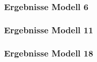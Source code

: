 \documentclass[onlymath]{beamer}
\begin{document}
\begin{frame}
	\frametitle{Ergebnisse Modell 6}
	\centering
\end{frame}


\begin{frame}
	\frametitle{Ergebnisse Modell 11}
	\centering
\end{frame}

\begin{frame}
	\frametitle{Ergebnisse Modell 18}
	\centering
\end{frame}
\end{document}
